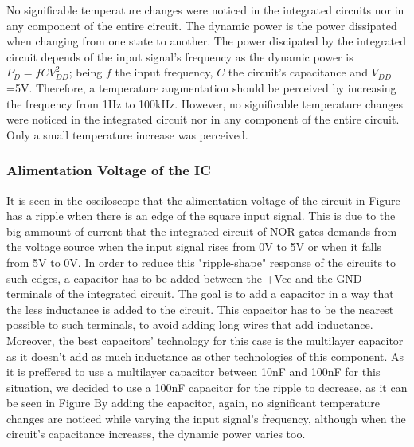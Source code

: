 \documentclass[a4paper,11pt]{report}
\begin{document}
No significable temperature changes were noticed in the integrated circuits nor in any component of the entire circuit.
The dynamic power is the power dissipated when changing from one state to another. The power discipated by the integrated circuit depends of the input signal's frequency as the dynamic power is $P_{D}=fCV_{DD}^{2}$; being $f$ the input frequency, $C$ the circuit's capacitance and $V_{DD}$=5V. Therefore, a temperature augmentation should be perceived by increasing the frequency from 1Hz to 100kHz. However, no significable temperature changes were noticed in the integrated circuit nor in any component of the entire circuit. Only a small temperature increase was perceived.



\subsubsection{\color{red}Alimentation Voltage of the IC}

It is seen in the osciloscope that the alimentation voltage of the circuit in Figure %
has a ripple when there is an edge of the square input signal. This is due to the big ammount of current that the integrated circuit of NOR gates demands from the voltage source when the input signal rises from 0V to 5V or when it falls from 5V to 0V. 
In order to reduce this "ripple-shape" response of the circuits to such edges, a capacitor has to be added between the +Vcc and the GND terminals of the integrated circuit. The goal is to add a capacitor in a way that the less inductance is added to the circuit. This capacitor has to be the nearest possible to such terminals, to avoid adding long wires that add inductance. Moreover,  the best capacitors' technology for this case is the multilayer capacitor as it doesn't add as much inductance as other technologies of this component. As it is preffered to use a multilayer capacitor between 10nF and 100nF for this situation, we decided to use a 100nF capacitor for the ripple to decrease, as it can be seen in Figure %
By adding the capacitor, again, no significant temperature changes are noticed while varying the input signal's frequency, although when the circuit's capacitance increases, the dynamic power varies too.
\end{document}
